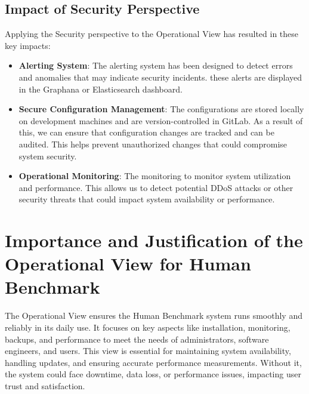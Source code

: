 \subsection{Impact of Security Perspective}

Applying the Security perspective to the Operational View has resulted in these
key impacts:

\begin{itemize}
    \item \textbf{Alerting System}: The alerting system has been designed to
    detect errors and anomalies that may indicate security incidents. these
    alerts are displayed in the Graphana or Elasticsearch dashboard.


    \item \textbf{Secure Configuration Management}: The configurations are stored
    locally on development machines and are version-controlled in GitLab. As a result
    of this, we can ensure that configuration changes are tracked and can be
    audited. This helps prevent unauthorized changes that could compromise system
    security.

    \item \textbf{Operational Monitoring}: The monitoring to monitor system
    utilization and performance. This allows us to detect potential DDoS attacks
    or other security threats that could impact system availability or
    performance.
\end{itemize}

\section{Importance and Justification of the Operational View for Human Benchmark}

The Operational View ensures the Human Benchmark system runs smoothly and
reliably in its daily use. It focuses on key aspects like installation,
monitoring, backups, and performance to meet the needs of administrators,
software engineers, and users. This view is essential for maintaining system
availability, handling updates, and ensuring accurate performance measurements.
Without it, the system could face downtime, data loss, or performance issues,
impacting user trust and satisfaction.


